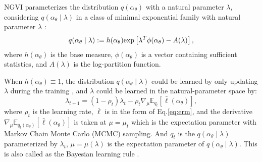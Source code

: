 \documentclass[10pt,twocolumn,letterpaper]{article}
\begin{document}
NGVI parameterizes the distribution $q(\alpha_\theta)$ with a natural parameter $\lambda$, considering $q(\alpha_\theta \mid \lambda)$ in a class of minimal exponential family with natural parameter $\lambda$ \cite{khan2017conjugate}:
\begin{equation} \label{eq:naturalPara}
q(\alpha_\theta \mid \lambda) :=h(\alpha_\theta)\textup{exp}\left [ \lambda^T\phi(\alpha_\theta)-A(\lambda) \right ],
\end{equation}
where $h(\alpha_\theta)$ is the base measure, $\phi(\alpha_\theta)$ is a vector containing sufficient statistics, and $A(\lambda)$ is the log-partition function. 


When $h(\alpha_\theta)\equiv 1$, the distribution $q(\alpha_\theta \mid \lambda)$ could be learned by only updating $\lambda$ during the training \cite{khan2018fast,khan2020}, and $\lambda$ could be learned in the natural-parameter space by:
\begin{equation} \label{eq:natureupdate}
\lambda_{t+1}= (1-\rho_t)\lambda_t-\rho_t \nabla_{\mu}\mathbb{E}_{q_t}\left [ \bar{\ell}(\alpha_\theta) \right ],
\end{equation}
where $\rho_t$ is the learning rate, $\bar{\ell}$ is in the form of Eq.\eqref{eq:erm}, and the derivative $\nabla_{\mu}\mathbb{E}_{q_t(\alpha_\theta)}\left [ \bar{\ell}(\alpha_\theta) \right ]$ is taken at $\mu=\mu_t$ which is the expectation parameter with Markov Chain Monte Carlo (MCMC) sampling. And $q_t$ is the $q(\alpha_\theta \mid \lambda)$ parameterized by $\lambda_{t}$, $\mu=\mu(\lambda)$ is the expectation parameter of $q(\alpha_\theta \mid \lambda)$. This is also called as the Bayesian learning rule \cite{khan2020}.
\end{document}
